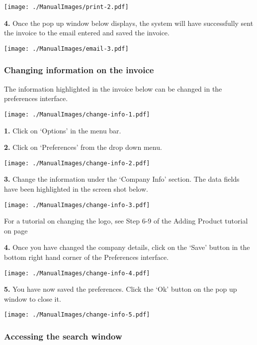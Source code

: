 \texttt{[image: ./ManualImages/print-2.pdf]}

\textbf{4.} Once the pop up window below displays, the system will have successfully sent the invoice to the email entered and saved the invoice.

\texttt{[image: ./ManualImages/email-3.pdf]}

\pagebreak
\subsubsection{Changing information on the invoice}
\label{fig:Changing information on the invoice}

The information highlighted in the invoice below can be changed in the preferences interface.

\texttt{[image: ./ManualImages/change-info-1.pdf]}

\pagebreak

\textbf{1.} Click on `Options' in the menu bar.

\textbf{2.} Click on `Preferences' from the drop down menu.

\texttt{[image: ./ManualImages/change-info-2.pdf]}

\pagebreak

\textbf{3.} Change the information under the `Company Info' section. The data fields have been highlighted in the screen shot below.

\texttt{[image: ./ManualImages/change-info-3.pdf]}

For a tutorial on changing the logo, see Step 6-9 of the Adding Product tutorial on page \pageref{fig:Adding a Product to the system}

\pagebreak

\textbf{4.} Once you have changed the company details, click on the `Save' button in the bottom right hand corner of the Preferences interface.

\texttt{[image: ./ManualImages/change-info-4.pdf]}

\pagebreak

\textbf{5.} You have now saved the preferences. Click the `Ok' button on the pop up window to close it.

\texttt{[image: ./ManualImages/change-info-5.pdf]}

\pagebreak
\subsubsection{Accessing the search window}
\label{fig:Accessing the search window}

